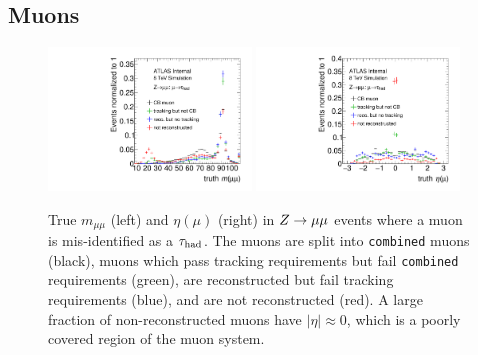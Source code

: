 \subsection{Muons}

\begin{figure}[tp]
  \centering
  \includegraphics[width=0.48\textwidth]{figures/tauperformance/muonfakes_mll}
  \includegraphics[width=0.48\textwidth]{figures/tauperformance/muonfakes_eta}
  \caption{True $m_{\mu\mu}$ (left) and $\eta(\mu)$ (right) in $Z \rightarrow \mu\mu$ events where a muon is mis-identified as a $\tau_\text{had}$. The muons are split into \texttt{combined} muons (black), muons which pass tracking requirements but fail \texttt{combined} requirements (green), are reconstructed but fail tracking requirements (blue), and are not reconstructed (red). A large fraction of non-reconstructed muons have $|\eta| \approx 0$, which is a poorly covered region of the muon system.}
  \label{fig:taus-muonfakes1}
\end{figure}

